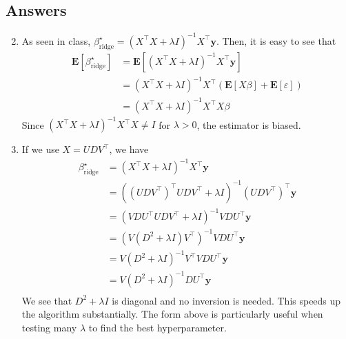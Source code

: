 \documentclass{article}
\begin{document}
    \subsection*{Answers}
    \begin{enumerate}
        \setcounter{enumi}{1}

        \item As seen in class, $\beta^\star_{\text{ridge}} = {(X^\top X + \lambda I)}^{-1} X^\top \mathbf{y}$. Then, it is easy to see that
        \begin{align*}
            \mathbf{E}[\beta^\star_{\text{ridge}}] &= \mathbf{E}[{(X^\top X + \lambda I)}^{-1} X^\top \mathbf{y}] \\
            &= {(X^\top X + \lambda I)}^{-1} X^\top (\mathbf{E}[X \beta] + \mathbf{E}[\varepsilon]) \\
            &= {(X^\top X + \lambda I)}^{-1} X^\top X \beta
        \end{align*}
        Since ${(X^\top X + \lambda I)}^{-1} X^\top X \neq I$ for $\lambda > 0$, the estimator is biased.

        \item If we use $X = U D V^\top$, we have
        \begin{align*}
            \beta^\star_{\text{ridge}} &= {(X^\top X + \lambda I)}^{-1} X^\top \mathbf{y} \\
            &= {({(U D V^\top)}^\top U D V^\top + \lambda I)}^{-1} {(U D V^\top)}^\top \mathbf{y} \\
            &= {(V D U^\top U D V^\top + \lambda I)}^{-1} V D U^\top \mathbf{y} \\
            &= {(V (D^2 + \lambda I) V^\top)}^{-1} V D U^\top \mathbf{y} \\
            &= V {(D^2 + \lambda I)}^{-1} V^\top V D U^\top \mathbf{y} \\
            &= V {(D^2 + \lambda I)}^{-1} D U^\top \mathbf{y} \\
        \end{align*}
        We see that $D^2 + \lambda I$ is diagonal and no inversion is needed. This speeds up the algorithm substantially. The form above is particularly useful when testing many $\lambda$ to find the best hyperparameter.


\end{enumerate}
\end{document}
